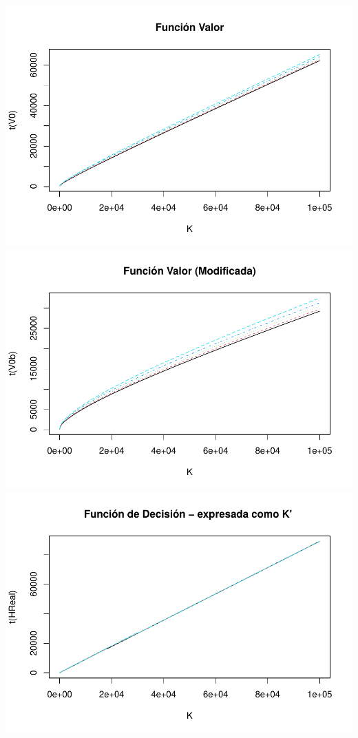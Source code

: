 \documentclass[
]{book}
\begin{document}
\includegraphics{Tarea-3-Ejercicio-3_files/figure-latex/unnamed-chunk-14-1.pdf}
\includegraphics{Tarea-3-Ejercicio-3_files/figure-latex/unnamed-chunk-14-2.pdf}
\includegraphics{Tarea-3-Ejercicio-3_files/figure-latex/unnamed-chunk-14-3.pdf}
\end{document}
